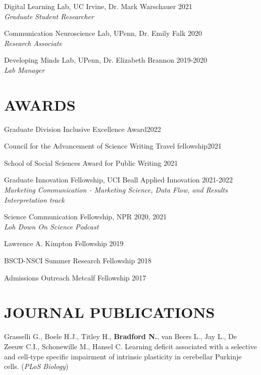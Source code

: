 \documentclass[margin, 10pt]{res} %
\begin{document}
\begin{resume}
{Digital Learning Lab, UC Irvine, Dr. Mark Warschauer} \hfill 2021 \\
{\sl Graduate Student Researcher}

{Communication Neuroscience Lab, UPenn, Dr. Emily Falk} \hfill 2020 \\
{\sl Research Associate}

{Developing Minds Lab, UPenn, Dr. Elizabeth Brannon} \hfill 2019-2020 \\
{\sl Lab Manager}


 
\section{AWARDS}

{Graduate Division Inclusive Excellence Award}\hfill 2022

{Council for the Advancement of Science Writing Travel fellowship}\hfill 2021

{School of Social Sciences Award for Public Writing} \hfill 2021

{Graduate Innovation Fellowship, UCI Beall Applied Innovation} \hfill 2021-2022 \\
{\sl Marketing Communication - Marketing
Science, Data Flow, and Results \\Interpretation track}

{Science Communication Fellowship, NPR} \hfill 2020, 2021 \\
{\sl Loh Down On Science Podcast}

{Lawrence A. Kimpton Fellowship} \hfill 2019 

{BSCD-NSCI Summer Research Fellowship} \hfill 2018 

{Admissions Outreach Metcalf Fellowship} \hfill 2017 

 
\section{JOURNAL PUBLICATIONS}
Grasselli G., Boele H.J., Titley H., \textbf{Bradford N.}, van Beers L., Jay L., De Zeeuw C.I., Schonewille M., Hansel C. Learning deficit associated with a selective and cell-type specific impairment of intrinsic plasticity in cerebellar Purkinje cells.  ({\sl PLoS Biology})


\end{resume}
\end{document}
